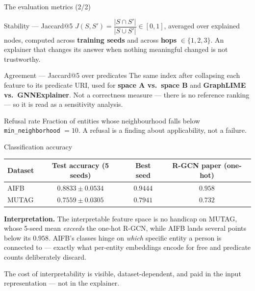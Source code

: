 \documentclass[10pt,aspectratio=169]{beamer}
\begin{document}
\begin{frame}{The evaluation metrics (2/2)}
  \begin{block}{Stability --- Jaccard@5}
    $J(S,S') = \dfrac{|S \cap S'|}{|S \cup S'|} \in [0,1]$, averaged over
    explained nodes, computed across \textbf{training seeds} and across
    \textbf{hops} $\in \{1,2,3\}$. An explainer that changes its answer when
    nothing meaningful changed is not trustworthy.
  \end{block}

  \begin{block}{Agreement --- Jaccard@5 over predicates}
    The same index after collapsing each feature to its predicate URI, used
    for \textbf{space A vs.\ space B} and \textbf{GraphLIME vs.\
    GNNExplainer}. Not a correctness measure --- there is no reference
    ranking --- so it is read as a sensitivity analysis.
  \end{block}

  \begin{block}{Refusal rate}
    Fraction of entities whose neighbourhood falls below
    \texttt{min\_neighborhood} $= 10$. A refusal is a finding about
    applicability, not a failure.
  \end{block}
\end{frame}

\begin{frame}{Classification accuracy}
  \begin{table}
    \footnotesize
    \begin{tabular}{lccc}
      \toprule
      \textbf{Dataset} & \textbf{Test accuracy (5 seeds)} & \textbf{Best seed} & \textbf{R-GCN paper (one-hot)} \\
      \midrule
      AIFB  & $0.8833 \pm 0.0534$ & $0.9444$ & $0.958$ \\
      MUTAG & $0.7559 \pm 0.0305$ & $0.7941$ & $0.732$ \\
      \bottomrule
    \end{tabular}
  \end{table}

  \vfill
  \textbf{Interpretation.} The interpretable feature space is no handicap on
  MUTAG, whose 5-seed mean \emph{exceeds} the one-hot R-GCN, while AIFB lands
  several points below its $0.958$. AIFB's classes hinge on \emph{which}
  specific entity a person is connected to --- exactly what per-entity
  embeddings encode for free and predicate counts deliberately discard.

  \vfill
  \begin{center}
    \alert{The cost of interpretability is visible, dataset-dependent, and
    paid in the input representation --- not in the explainer.}
  \end{center}
\end{frame}
\end{document}
